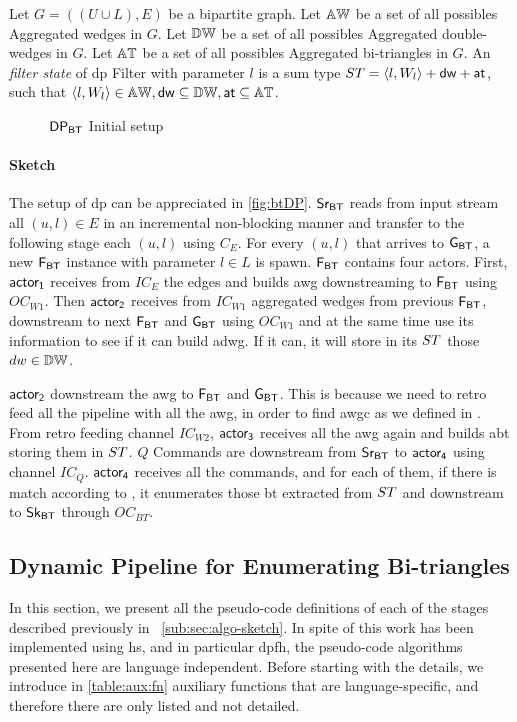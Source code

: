 \begin{definition}
Let $G=((U\cup L),E)$ be a bipartite graph. 
Let $\mathbb{AW}$ be a set of all possibles Aggregated wedges in $G$.
Let $\mathbb{DW}$ be a set of all possibles Aggregated double-wedges in $G$.
Let $\mathbb{AT}$ be a set of all possibles Aggregated bi-triangles in $G$.
An \textit{filter state} of \acrshort{dp} Filter with parameter $l$ is a sum type $ST = \left\langle l, W_l \right\rangle + \mathsf{dw} + \mathsf{at}$, such that $\left\langle l, W_l \right\rangle \in \mathbb{AW}, \mathsf{dw} \subseteq \mathbb{DW}, \mathsf{at} \subseteq \mathbb{AT}$.
\end{definition}
 
\begin{figure}[h]
\centering  
{}
\caption{$\mathsf{DP_{BT}}$ Initial setup}
\label{fig:btDP}
\end{figure}

\paragraph{Sketch} The setup of \acrshort{dp} can be appreciated in \autoref{fig:btDP}. $\mathsf{Sr_{BT}}$ reads from input stream all $(u,l) \in E$ in an incremental non-blocking manner and transfer to the following stage each $(u,l)$ using $C_E$.
For every $(u,l)$ that arrives to $\mathsf{G_{BT}}$, a new $\mathsf{F_{BT}}$ instance with parameter $l \in L$ is spawn. $\mathsf{F_{BT}}$ contains four actors. 
First, $\mathsf{actor_1}$ receives from $IC_E$ the edges and builds \acrshort{awg} downstreaming to $\mathsf{F_{BT}}$ using $OC_{W1}$. 
Then $\mathsf{actor_2}$ receives from $IC_{W1}$ aggregated wedges from previous $\mathsf{F_{BT}}$, downstream to next $\mathsf{F_{BT}}$ and $\mathsf{G_{BT}}$ using $OC_{W1}$ and at the same time use its information to see 
if it can build \acrshort{adwg}. If it can, it will store in its $ST$ those $dw \in \mathbb{DW}$.

$\mathsf{actor_2}$ downstream the \acrshort{awg} to  $\mathsf{F_{BT}}$ and $\mathsf{G_{BT}}$. This is because we need to retro feed all the pipeline with all the \acrshort{awg}, in order to find \acrshort{awgc} as we defined in .
From retro feeding channel $IC_{W2}$, $\mathsf{actor_3}$ receives all the \acrshort{awg} again and builds \acrshort{abt} storing them in $ST$. 
$Q$ Commands are downstream from $\mathsf{Sr_{BT}}$ to $\mathsf{actor_4}$ using channel $IC_Q$. $\mathsf{actor_4}$ receives all the commands, and for each of them, if there is match according to , it enumerates those \acrshort{bt} extracted from $ST$ and downstream to $\mathsf{Sk_{BT}}$ through $OC_{BT}$.

\subsection{Dynamic Pipeline for Enumerating Bi-triangles}
In this section, we present all the pseudo-code definitions of each of the stages described previously in ~\autoref{sub:sec:algo-sketch}. 
In spite of this work has been implemented using \acrshort{hs}, and in particular \acrshort{dpfh}, the pseudo-code algorithms presented here are language independent.
Before starting with the details, we introduce in \autoref{table:aux:fn} auxiliary functions that are language-specific, and therefore there are only listed and not detailed.

